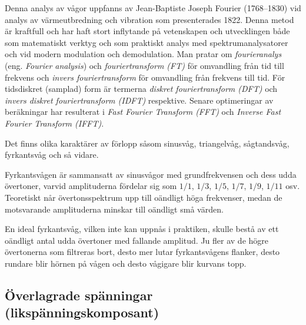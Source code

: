 
Denna analys av vågor uppfanns av Jean-Baptiste Joseph Fourier (1768--1830)
vid analys av värmeutbredning och vibration som presenterades 1822.
Denna metod är kraftfull och har haft stort inflytande på vetenskapen och
utvecklingen både som matematiskt verktyg och som praktiskt analys med
spektrumanalysatorer och vid modern modulation och demodulation.
Man pratar om \emph{fourieranalys} (eng. \emph{Fourier analysis}) och
\emph{fouriertransform (FT)} för omvandling från tid till frekvens och
\emph{invers fouriertransform} för omvandling från frekvens till tid.
För tidsdiskret (samplad) form är termerna
\emph{diskret fouriertransform (DFT)} och
\emph{invers diskret fouriertransform (IDFT)} respektive.
Senare optimeringar av beräkningar har resulterat i
\emph{Fast Fourier Transform (FFT)} och
\emph{Inverse Fast Fourier Transform (IFFT)}.

Det finns olika karaktärer av förlopp såsom sinusvåg, triangelvåg, sågtandsvåg,
fyrkantsvåg och så vidare.

Fyrkantsvågen är sammansatt av sinusvågor med grundfrekvensen och dess udda
övertoner, varvid amplituderna fördelar sig som \(1/1\), \(1/3\), \(1/5\),
\(1/7\), \(1/9\), \(1/11\) osv.
Teoretiskt når övertonsspektrum upp till oändligt höga frekvenser, medan de
motsvarande amplituderna minskar till oändligt små värden.

En ideal fyrkantsvåg, vilken inte kan uppnås i praktiken, skulle bestå av ett
oändligt antal udda övertoner med fallande amplitud.
Ju fler av de högre övertonerna som filtreras bort, desto mer lutar
fyrkantsvågens flanker, desto rundare blir hörnen på vågen och desto vågigare
blir kurvans topp.

\subsection{Överlagrade spänningar (likspänningskomposant)}

